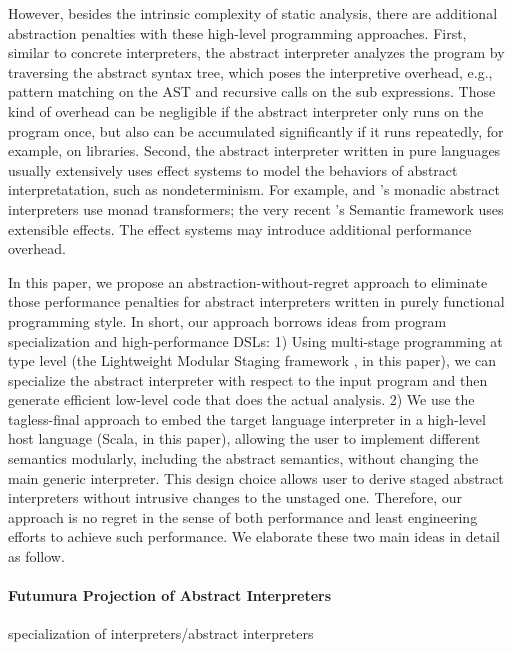 However, besides the intrinsic complexity of static analysis, there are
additional abstraction penalties with these high-level programming approaches.
First, similar to concrete interpreters, the abstract interpreter analyzes the
program by traversing the abstract syntax tree, which poses the interpretive
overhead, e.g., pattern matching on the AST and recursive calls on the sub
expressions. Those kind of overhead can be negligible if the abstract
interpreter only runs on the program once, but also can be accumulated
significantly if it runs repeatedly, for example, on libraries. Second, the
abstract interpreter written in pure languages usually extensively uses effect
systems to model the behaviors of abstract interpretatation, such as
nondeterminism. For example, \citet{DBLP:journals/pacmpl/DaraisLNH17} and
\citet{Sergey:2013:MAI:2491956.2491979}'s monadic abstract interpreters use
monad transformers; the very recent \citet{Githubsemantic}'s Semantic framework
uses extensible effects. The effect systems may introduce additional performance
overhead.

In this paper, we propose an abstraction-without-regret approach to eliminate
those performance penalties for abstract interpreters written in purely
functional programming style. In short, our approach borrows ideas from program
specialization and high-performance DSLs: 1) Using multi-stage programming at
type level (the Lightweight Modular Staging framework
\cite{DBLP:conf/gpce/RompfO10}, in this paper), we can
specialize the abstract interpreter with respect to the input program and then
generate efficient low-level code that does the actual analysis. 2) We use the
tagless-final approach to embed the target language interpreter in a high-level
host language (Scala, in this paper), allowing the user to implement different
semantics modularly, including the abstract semantics, without changing the main
generic interpreter. This design choice allows user to derive staged abstract
interpreters without intrusive changes to the unstaged one. Therefore, our
approach is no regret in the sense of both performance and least engineering
efforts to achieve such performance. We elaborate these two main ideas in detail
as follow.

\paragraph{Futumura Projection of Abstract Interpreters}

specialization of interpreters/abstract interpreters

